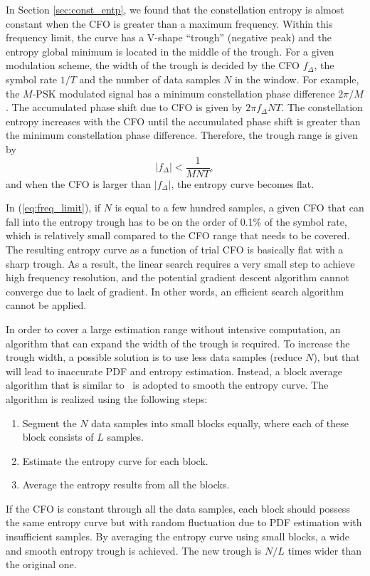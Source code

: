 \documentclass[journal,comsoc,onecolumn, 12pt,draftclsnofoot]{IEEEtran}
\begin{document}
In Section \ref{sec:const_entp}, we found that the constellation entropy is almost constant when the CFO is greater than a maximum frequency.
Within this frequency limit, the curve has a V-shape ``trough'' (negative peak) and the entropy global minimum is located in the middle of the trough.
For a given modulation scheme, the width of the trough is decided by the CFO $f_\Delta$, the symbol rate $1/T$ and the number of data samples $N$ in the window.
For example, the \(M\)-PSK modulated signal has a minimum constellation phase difference \(2\pi/M\).
The accumulated phase shift due to CFO is given by \(2\pi f_\Delta N T\).
The constellation entropy increases with the CFO until the accumulated phase shift is greater than the minimum constellation phase difference. 
Therefore, the trough range is given by
\begin{equation}
\left| {f_\Delta } \right| < \frac{1}{{MNT}},
\label{eq:freq_limit}
\end{equation}
\noindent and when the CFO is larger than $\left| {f_\Delta } \right|$, the entropy curve becomes flat.


In (\ref{eq:freq_limit}), if \(N\) is equal to a few hundred samples, a given CFO that can fall into the entropy trough has to be on the order of 0.1\% of the symbol rate, which is relatively small compared to the CFO range that needs to be covered.
The resulting entropy curve as a function of trial CFO is basically flat with a sharp trough.
As a result, the linear search requires a very small step to achieve high frequency resolution, and the potential gradient descent algorithm cannot converge due to lack of gradient.
In other words, an efficient search algorithm cannot be applied. 

In order to cover a large estimation range without intensive computation, an algorithm that can expand the width of the trough is required.
To increase the trough width, a possible solution is to use less data samples (reduce \(N\)), but that will lead to inaccurate PDF and entropy estimation.
Instead, a block average algorithm that is similar to~\cite{YuanlingHuang2007} is adopted to smooth the entropy curve. The algorithm is realized using the following steps:

\begin{enumerate}
\item Segment the \(N\) data samples into small blocks equally, where each of these block consists of \(L\) samples. 
\item Estimate the entropy curve for each block.
\item Average the entropy results from all the blocks.
\end{enumerate}
If the CFO is constant through all the data samples, each block should possess the same entropy curve but with random fluctuation due to PDF estimation with insufficient samples.
By averaging the entropy curve using small blocks, a wide and smooth entropy trough is achieved.
The new trough is $N/L$ times wider than the original one.
\end{document}
